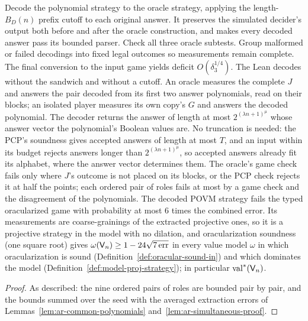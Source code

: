 \begin{lemma}
\label{lem:ar-decoding}
\leanok
Decode the polynomial strategy to the oracle strategy, applying the
length-$B_D(n)$ prefix cutoff to each original answer. It preserves the
simulated decider's output both before and after the oracle construction,
and makes every decoded answer pass its bounded parser. Check all three
oracle subtests. Group malformed or failed decodings into fixed legal
outcomes so measurements remain complete. The final conversion to the
input game yields deficit $O(\delta_3^{1/4})$.
The Lean decodes without the sandwich and without a cutoff. An oracle measures the complete $J$
and answers the pair decoded from its first two answer polynomials, read on their blocks; an
isolated player measures its own copy's $G$ and answers the decoded polynomial. The decoder
returns the answer of length at most $2^{(\lambda n+1)^\mu}$ whose answer vector the polynomial's
Boolean values are. No truncation is needed: the PCP's soundness gives accepted answers of length
at most $T$, and an input within its budget rejects answers longer than
$2^{(\lambda n+1)^\mu}$, so accepted answers already fit its alphabet, where the answer vector
determines them. The oracle's game check fails only where $J$'s outcome is not placed on its
blocks, or the PCP check rejects it at half the points; each ordered pair of roles fails at most
by a game check and the disagreement of the polynomials. The decoded POVM strategy fails the
typed oracularized game with probability at most $6$ times the combined error. Its measurements
are coarse-grainings of the extracted projective ones, so it is a projective strategy in the
model with no dilation, and oracularization soundness (one square root) gives
$\omega(\mathsf{V}_n)\geq 1-24\sqrt{7\,\mathrm{err}}$ in every value model $\omega$ in which
oracularization is sound (Definition~\ref{def:oracular-sound-in}) and which dominates the model
(Definition~\ref{def:model-proj-strategy}); in particular $\mathrm{val}^*(\mathsf{V}_n)$.
\end{lemma}

\begin{proof}
\leanok
As described: the nine ordered pairs of roles are bounded pair by pair, and the bounds summed
over the seed with the averaged extraction errors of Lemmas~\ref{lem:ar-common-polynomials}
and~\ref{lem:ar-simultaneous-proof}.
\end{proof}

